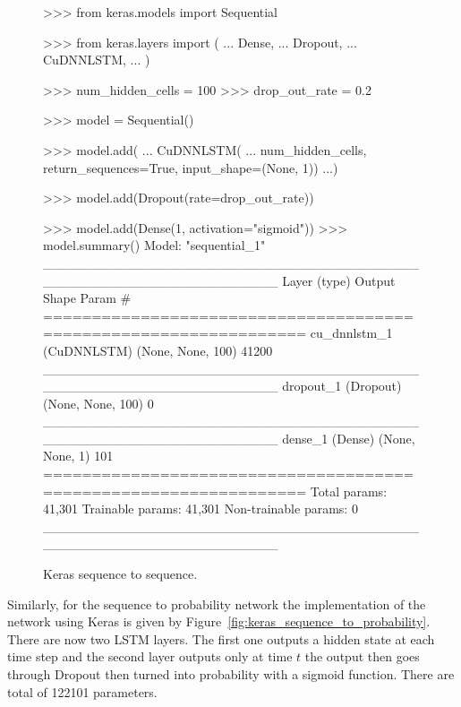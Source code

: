 \begin{figure}[!htbp]
\begin{usagepy}
>>> from keras.models import Sequential

>>> from keras.layers import (
...     Dense,
...     Dropout,
...     CuDNNLSTM,
... )

>>> num_hidden_cells = 100
>>> drop_out_rate = 0.2

>>> model = Sequential()

>>> model.add(
...    CuDNNLSTM(
...        num_hidden_cells, return_sequences=True, input_shape=(None, 1))
...)

>>> model.add(Dropout(rate=drop_out_rate))

>>> model.add(Dense(1, activation="sigmoid"))
>>> model.summary()
Model: "sequential_1"
_________________________________________________________________
Layer (type)                 Output Shape              Param #   
=================================================================
cu_dnnlstm_1 (CuDNNLSTM)     (None, None, 100)         41200     
_________________________________________________________________
dropout_1 (Dropout)          (None, None, 100)         0         
_________________________________________________________________
dense_1 (Dense)              (None, None, 1)           101       
=================================================================
Total params: 41,301
Trainable params: 41,301
Non-trainable params: 0
_________________________________________________________________

\end{usagepy}
\caption{Keras sequence to sequence.}\label{fig:keras_sequence_to_sequence}
\end{figure}

Similarly, for the sequence to probability network the implementation of the
network using Keras is given by Figure~\ref{fig:keras_sequence_to_probability}.
There are now two LSTM layers. The first one outputs a hidden state at each time
step and the second layer outputs only at time \(t\) the output then goes
through Dropout then turned into probability with a sigmoid function. There are
total of 122101 parameters.

